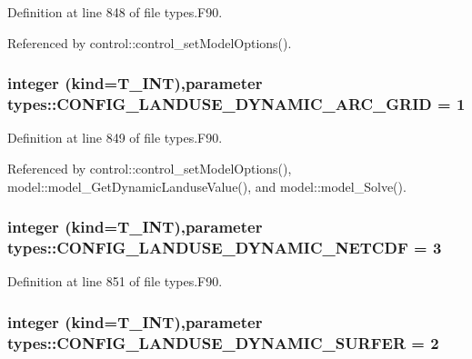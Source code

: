 Definition at line 848 of file types.F90.



Referenced by control::control\_\-setModelOptions().

\hypertarget{namespacetypes_adcf4488697f417e70c6730294b1d11ba}{
\subsubsection[{CONFIG\_\-LANDUSE\_\-DYNAMIC\_\-ARC\_\-GRID}]{\setlength{\rightskip}{0pt plus 5cm}integer (kind={\bf T\_\-INT}),parameter {\bf types::CONFIG\_\-LANDUSE\_\-DYNAMIC\_\-ARC\_\-GRID} = 1}}
\label{namespacetypes_adcf4488697f417e70c6730294b1d11ba}


Definition at line 849 of file types.F90.



Referenced by control::control\_\-setModelOptions(), model::model\_\-GetDynamicLanduseValue(), and model::model\_\-Solve().

\hypertarget{namespacetypes_a7eff03ddd24b0d84b74382dc2b48dea6}{
\subsubsection[{CONFIG\_\-LANDUSE\_\-DYNAMIC\_\-NETCDF}]{\setlength{\rightskip}{0pt plus 5cm}integer (kind={\bf T\_\-INT}),parameter {\bf types::CONFIG\_\-LANDUSE\_\-DYNAMIC\_\-NETCDF} = 3}}
\label{namespacetypes_a7eff03ddd24b0d84b74382dc2b48dea6}


Definition at line 851 of file types.F90.

\hypertarget{namespacetypes_a953dbde53597b3e1676b05d1c09c89f7}{
\subsubsection[{CONFIG\_\-LANDUSE\_\-DYNAMIC\_\-SURFER}]{\setlength{\rightskip}{0pt plus 5cm}integer (kind={\bf T\_\-INT}),parameter {\bf types::CONFIG\_\-LANDUSE\_\-DYNAMIC\_\-SURFER} = 2}}
\label{namespacetypes_a953dbde53597b3e1676b05d1c09c89f7}



